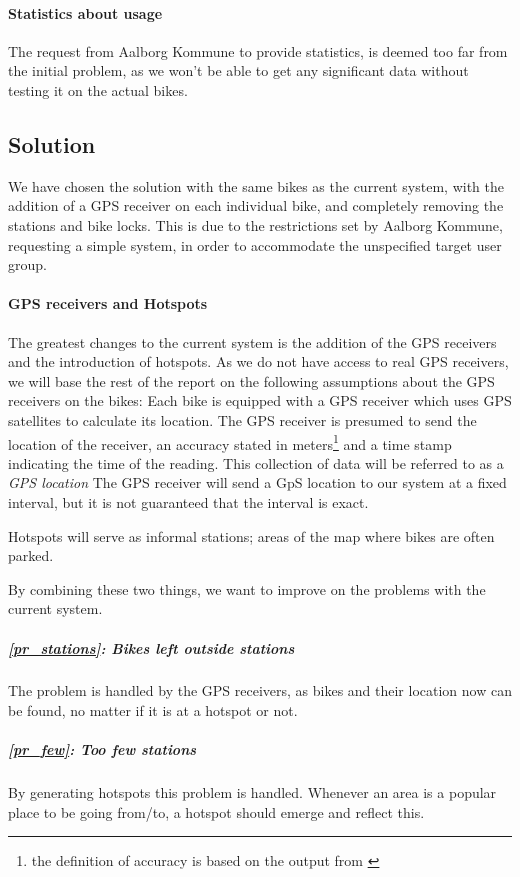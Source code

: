 \paragraph{Statistics about usage} The request from Aalborg Kommune to provide statistics, is deemed too far from the initial problem, as we won't be able to get any significant data without testing it on the actual bikes.

\subsection{Solution} \label{prob_statement:solution}
We have chosen the solution with the same bikes as the current system, with the addition of a GPS receiver on each individual bike, and completely removing the stations and bike locks.
This is due to the restrictions set by Aalborg Kommune, requesting a simple system, in order to accommodate the unspecified target user group.


\paragraph{GPS receivers and Hotspots}\label{gpsreceiver}
The greatest changes to the current system is the addition of the GPS receivers and the introduction of hotspots.
As we do not have access to real GPS receivers, we will base the rest of the report on the following assumptions about the GPS receivers on the bikes:
Each bike is equipped with a GPS receiver which uses GPS satellites to calculate its location. The GPS receiver is presumed to send the location of the receiver, an accuracy stated in meters\footnote{the definition of accuracy is based on the output from \citet{followmee}} and a time stamp indicating the time of the reading.
This collection of data will be referred to as a \emph{GPS location}	
The GPS receiver will send a GpS location to our system at a fixed interval, but it is not guaranteed that the interval is exact.

Hotspots will serve as informal stations; areas of the map where bikes are often parked.

By combining these two things, we want to improve on the problems with the current system.

\subparagraph{\ref{pr_stations}: Bikes left outside stations} The problem is handled by the GPS receivers, as bikes and their location now can be found, no matter if it is at a hotspot or not.

\subparagraph{\ref{pr_few}: Too few stations} By generating hotspots this problem is handled.
Whenever an area is a popular place to be going from/to, a hotspot should emerge and reflect this.

